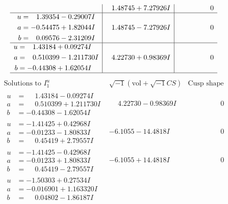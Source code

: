 \documentclass[1p]{elsarticle_modified}
\theoremstyle{definition}
\newcommand{\I}{\sqrt{-1}}
\begin{document}
$$\begin{array}{c|c|c}
 & \phantom{-}1.48745 + 7.27926 I & \phantom{-0.000000 } 0 \\ \hline\begin{aligned}
u &= \phantom{-}1.39354 - 0.29007 I \\
a &= -0.54475 + 1.82044 I \\
b &= \phantom{-}0.09576 - 2.31209 I\end{aligned}
 & \phantom{-}1.48745 - 7.27926 I & \phantom{-0.000000 } 0 \\ \hline\begin{aligned}
u &= \phantom{-}1.43184 + 0.09274 I \\
a &= \phantom{-}0.510399 - 1.211730 I \\
b &= -0.44308 + 1.62054 I\end{aligned}
 & \phantom{-}4.22730 + 0.98369 I & \phantom{-0.000000 } 0\\
 \hline 
 \end{array}$$\newpage$$\begin{array}{c|c|c}  
\text{Solutions to }I^u_{1}& \I (\text{vol} + \sqrt{-1}CS) & \text{Cusp shape}\\
 \hline 
\begin{aligned}
u &= \phantom{-}1.43184 - 0.09274 I \\
a &= \phantom{-}0.510399 + 1.211730 I \\
b &= -0.44308 - 1.62054 I\end{aligned}
 & \phantom{-}4.22730 - 0.98369 I & \phantom{-0.000000 } 0 \\ \hline\begin{aligned}
u &= -1.41425 + 0.42968 I \\
a &= -0.01233 - 1.80833 I \\
b &= \phantom{-}0.45419 + 2.79557 I\end{aligned}
 & -6.1055 - 14.4818 I & \phantom{-0.000000 } 0 \\ \hline\begin{aligned}
u &= -1.41425 - 0.42968 I \\
a &= -0.01233 + 1.80833 I \\
b &= \phantom{-}0.45419 - 2.79557 I\end{aligned}
 & -6.1055 + 14.4818 I & \phantom{-0.000000 } 0 \\ \hline\begin{aligned}
u &= -1.50303 + 0.27534 I \\
a &= -0.016901 + 1.163320 I \\
b &= \phantom{-}0.04802 - 1.86187 I\end{aligned}

\end{array}$$
\end{document}
